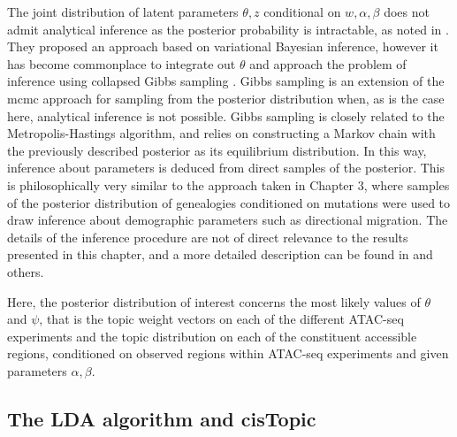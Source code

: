 The joint distribution of latent parameters $\theta, z$ conditional on $w, \alpha, \beta$ does not admit analytical inference as the posterior probability is intractable, as noted in \textcite{Blei2003}. They proposed an approach based on variational Bayesian inference, however it has become commonplace to integrate out $\theta$ and approach the problem of inference using collapsed Gibbs sampling \cite{Qiu2014,Magnusson2018,Park2019}. Gibbs sampling is an extension of the \gls{mcmc} approach for sampling from the posterior distribution when, as is the case here, analytical inference is not possible. Gibbs sampling is closely related to the Metropolis-Hastings algorithm, and relies on constructing a Markov chain with the previously described posterior as its equilibrium distribution. In this way, inference about parameters is deduced from direct samples of the posterior. This is philosophically very similar to the approach taken in Chapter 3, where samples of the posterior distribution of genealogies conditioned on mutations were used to draw inference about demographic parameters such as directional migration. The details of the inference procedure are not of direct relevance to the results presented in this chapter, and a more detailed description can be found in \textcite{Qiu2014} and others.

Here, the posterior distribution of interest concerns the most likely values of $\theta$ and $\psi$, that is the topic weight vectors on each of the different ATAC-seq experiments and the topic distribution on each of the constituent accessible regions, conditioned on observed regions within ATAC-seq experiments and given parameters $\alpha, \beta$.

\subsection{The LDA algorithm and cisTopic}

